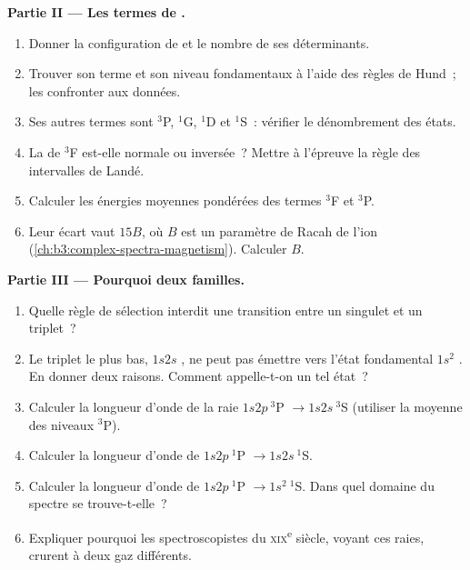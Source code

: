 \begin{problem}
\medskip\noindent\textbf{Partie II --- Les termes de .}
\begin{enumerate}[resume]
  \item Donner la configuration de  et le nombre de ses
        déterminants.
  \item Trouver son terme et son niveau fondamentaux à l'aide des règles
        de Hund~; les confronter aux données.
  \item Ses autres termes sont ${}^3$P, ${}^1$G, ${}^1$D et ${}^1$S~:
        vérifier le dénombrement des états.
  \item La  de ${}^3$F est-elle normale ou inversée~?
        Mettre à l'épreuve la règle des intervalles de Landé.
  \item Calculer les énergies moyennes pondérées des termes ${}^3$F et
        ${}^3$P.
  \item Leur écart vaut $15B$, où $B$ est un paramètre de Racah de l'ion
        (\cref{ch:b3:complex-spectra-magnetism}). Calculer $B$.
\end{enumerate}

\medskip\noindent\textbf{Partie III --- Pourquoi deux familles.}
\begin{enumerate}[resume]
  \item Quelle règle de sélection interdit une transition entre un
        singulet et un triplet~?
  \item Le triplet le plus bas, $1s2s$ , ne peut pas
        émettre vers l'état fondamental $1s^2$ . En donner
        deux raisons. Comment appelle-t-on un tel état~?
  \item Calculer la longueur d'onde de la raie $1s2p\ {}^3$P $\to 1s2s\ {}^3$S (utiliser
        la moyenne des niveaux ${}^3$P).
  \item Calculer la longueur d'onde de $1s2p\ {}^1$P $\to 1s2s\ {}^1$S.
  \item Calculer la longueur d'onde de $1s2p\ {}^1$P $\to 1s^2\ {}^1$S.
        Dans quel domaine du spectre se trouve-t-elle~?
  \item Expliquer pourquoi les spectroscopistes du \textsc{xix}\textsuperscript{e}
        siècle, voyant ces raies, crurent à deux gaz différents.
\end{enumerate}


\end{problem}
